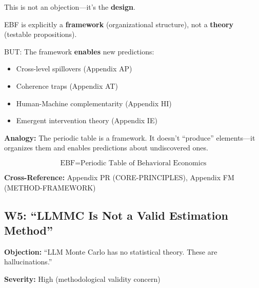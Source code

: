 \begin{axiom}
This is not an objection---it's the \textbf{design}.

EBF is explicitly a \textbf{framework} (organizational structure),
not a \textbf{theory} (testable propositions).

BUT: The framework \textbf{enables} new predictions:
\begin{itemize}[nosep]
    \item Cross-level spillovers (Appendix AP)
    \item Coherence traps (Appendix AT)
    \item Human-Machine complementarity (Appendix HI)
    \item Emergent intervention theory (Appendix IE)
\end{itemize}

\textbf{Analogy:} The periodic table is a framework. It doesn't ``produce''
elements---it organizes them and enables predictions about undiscovered ones.

\begin{equation}
\text{EBF} = \text{Periodic Table of Behavioral Economics}
\end{equation}
\end{axiom}

\textbf{Cross-Reference:} Appendix PR (CORE-PRINCIPLES), Appendix FM (METHOD-FRAMEWORK)

\subsection{W5: ``LLMMC Is Not a Valid Estimation Method''}
\label{sec:da-w5}

\begin{tcolorbox}[colback=gray!5!white, colframe=gray!75!black]
\textbf{Objection:} ``LLM Monte Carlo has no statistical theory. These are hallucinations.''

\textbf{Severity:} High (methodological validity concern)
\end{tcolorbox}

